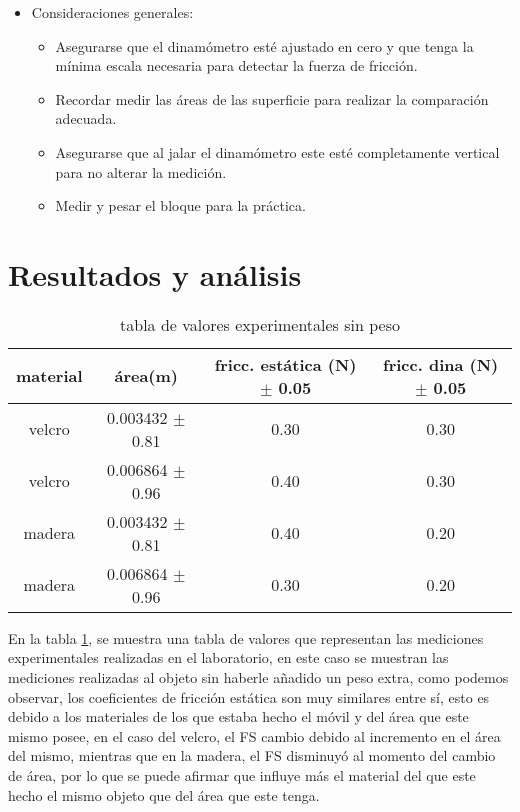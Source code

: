 \documentclass{article}
\begin{document}
\begin{multicols}{2}
\begin{itemize}
\item Consideraciones generales:
\begin{itemize}
\item Asegurarse que el dinamómetro esté ajustado en cero y que tenga la mínima escala necesaria para detectar la fuerza de fricción.
\item Recordar medir las áreas de las superficie para realizar la comparación adecuada.
\item Asegurarse que al jalar el dinamómetro este esté completamente vertical para no alterar la medición.
\item Medir y pesar el bloque para la práctica.
\end{itemize}
\end{itemize}

\end{multicols}
\section{Resultados y análisis}\label{Resultados}			%

\begin{table}[H]
	\centering	
	\begin{tabular}{|c|c|c|c|}
		\hline
		material & área(m) & fricc. estática (N) $\pm$ 0.05 & fricc. dina (N) $\pm$ 0.05 \\  	
		\hline
		velcro & 0.003432 $\pm$ 0.81 & 0.30 & 0.30 \\
		\hline
		velcro & 0.006864 $\pm$ 0.96 & 0.40 & 0.30 \\
		\hline
		madera & 0.003432 $\pm$ 0.81 & 0.40 & 0.20 \\
		\hline
		madera & 0.006864 $\pm$ 0.96 & 0.30 & 0.20 \\
		\hline
	\end{tabular}
	\caption{tabla de valores experimentales sin peso}
	\label{tab:1}
\end{table}

En la tabla \ref{tab:1}, se muestra una tabla de valores que representan las mediciones experimentales realizadas en el laboratorio, en este caso se muestran las mediciones realizadas al objeto sin haberle añadido un peso extra, como podemos observar, los coeficientes de fricción estática son muy similares entre sí, esto es debido a los materiales de los que estaba hecho el móvil y del área que este mismo posee, en el caso del velcro, el FS cambio debido al incremento en el área del mismo, mientras que en la madera, el FS disminuyó al momento del cambio de área, por lo que se puede afirmar que influye más el material del que este hecho el mismo objeto que del área que este tenga.
\end{document}
